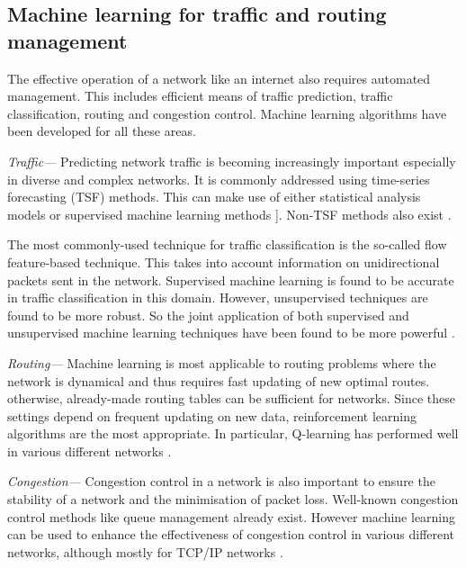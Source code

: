 \documentclass[twocolumn, aps, rmp, amsmath, amssymb, nofootinbib, superscriptaddress, longbibliography, floatfix, table-of-contents, eqsecnum]{revtex4-2}
\begin{document}
\subsection{Machine learning for traffic and routing management}
The effective operation of a network like an internet also requires automated management. This includes efficient means of traffic prediction, traffic classification, routing and congestion control. Machine learning algorithms have been developed for all these areas.

\textit{Traffic---} Predicting network traffic is becoming increasingly important especially in diverse and complex networks. It is commonly addressed using time-series forecasting (TSF) methods. This can make use of either statistical analysis models or supervised machine learning methods \cite{bermolen2009support, chabaa2010identification, cortez2006internet}]. Non-TSF methods also exist \cite{chen2016predicting, li2016inter}.

The most commonly-used technique for traffic classification is the so-called flow feature-based
technique. This takes into account information on unidirectional packets sent in the network. Supervised machine learning is found to be accurate in traffic classification in this domain. However, unsupervised techniques are found to be more robust. So the joint application of both supervised and unsupervised machine learning techniques have been found to be more powerful \cite{erman2007offline, zhang2015robust}.

\textit{Routing---} Machine learning is most applicable to routing problems where the network is dynamical and thus requires fast updating of new optimal routes. otherwise, already-made routing tables can be sufficient for networks. Since these settings depend on frequent updating on new data, reinforcement learning algorithms are the most appropriate. In particular, Q-learning has performed well in various different networks \cite{wang2006adaptive, forster2007froms, arroyo2007q}.

\textit{Congestion---} Congestion control in a network is also important to ensure the stability of a network and the minimisation of packet loss. Well-known congestion control methods like queue management already exist. However machine learning can be used to enhance the effectiveness of congestion control in various different networks, although mostly for TCP/IP networks \cite{liu2002end, barman2004model, el2005improving}. 

\end{document}
